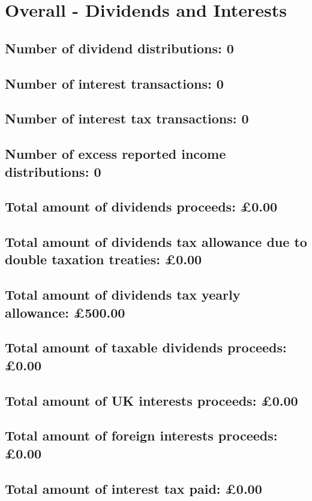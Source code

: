 \documentclass{article}
\begin{document}
\section*{Overall - Dividends and Interests}
\subsection*{Number of dividend distributions: 0}
\subsection*{Number of interest transactions: 0}
\subsection*{Number of interest tax transactions: 0}
\subsection*{Number of excess reported income distributions: 0}
\subsection*{Total amount of dividends proceeds: £0.00}
\subsection*{Total amount of dividends tax allowance due to double taxation treaties: £0.00}
\subsection*{Total amount of dividends tax yearly allowance: £500.00}
\subsection*{Total amount of taxable dividends proceeds: £0.00}
\subsection*{Total amount of UK interests proceeds: £0.00}
\subsection*{Total amount of foreign interests proceeds: £0.00}
\subsection*{Total amount of interest tax paid: £0.00}
\end{document}

